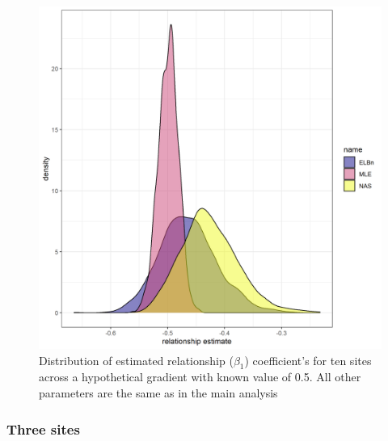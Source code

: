 \documentclass[
]{article}
\begin{document}
\begin{figure}
\centering
\includegraphics{figures/PLB_10_sites_relationship_density.png}
\caption{Distribution of estimated relationship (\(\beta_1\))
coefficient's for ten sites across a hypothetical gradient with known
value of 0.5. All other parameters are the same as in the main analysis}
\end{figure}

\hypertarget{three-sites}{%
\subsubsection{Three sites}\label{three-sites}}
\end{document}
